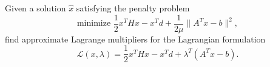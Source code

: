 \documentclass[12pt, leqno]{article}
\begin{document}

Given a solution $\hat{x}$ satisfying the penalty problem
\[
  \mbox{minimize } \frac{1}{2} x^T H x - x^T d + \frac{1}{2\mu} \|A^Tx-b\|^2,
\]
find approximate Lagrange multipliers for the Lagrangian formulation
\[
  \mathcal{L}(x, \lambda) = \frac{1}{2} x^T H x - x^T d + \lambda^T (A^T x - b).
\]
\end{document}
